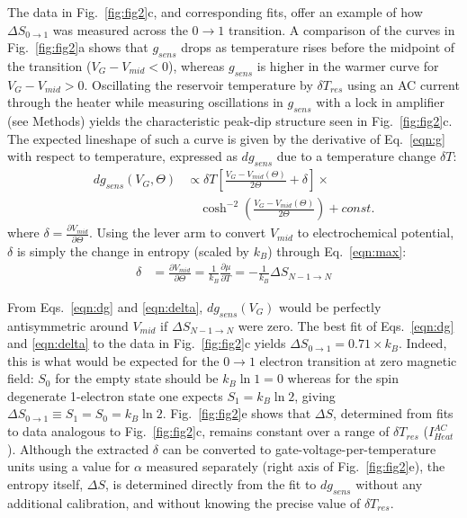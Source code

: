 \documentclass[twocolumn,showpacs,amsmath,amssymb,prl,aps,superscriptaddress]{revtex4-1}
\begin{document}
The data in Fig.~\ref{fig:fig2}c, and corresponding fits, offer an example of how $\Delta S_{0\rightarrow 1}$ was measured across the $0 \rightarrow 1$ transition.  A comparison of the curves in Fig.~\ref{fig:fig2}a shows that $g_{sens}$ drops as temperature rises before the midpoint of the transition ($V_G-V_{mid}<0$), whereas $g_{sens}$ is higher in the warmer curve for $V_G-V_{mid}>0$.   Oscillating the reservoir temperature by $\delta T_{res}$ using an AC current through the heater while measuring oscillations in $g_{sens}$ with a lock in amplifier (see Methods) yields the characteristic peak-dip structure seen in Fig.~\ref{fig:fig2}c.  The expected lineshape of such a curve is given by the derivative of Eq.~\ref{eqn:g} with respect to temperature, expressed as $dg_{sens}$ due to a temperature change $\delta T$:
%
\begin{align}
\label{eqn:dg}
        dg_{sens}(V_G, \Theta) &\propto \delta T \left[ \frac{V_G-V_{mid}(\Theta)}{2\Theta} +\delta \right]\times \\
        				      &\quad\cosh^{-2}\left(\frac{V_G-V_{mid}(\Theta)}{2\Theta}\right) + const. \nonumber
\end{align}
%
where $\delta=\frac{\partial V_{mid}}{\partial \Theta}$. Using the lever arm to convert $V_{mid}$ to electrochemical potential, $\delta$ is simply the change in entropy (scaled by $k_B$) through Eq.~\ref{eqn:max}:
%
\begin{align}
\label{eqn:delta}
        \delta &= \frac{\partial V_{mid}}{\partial \Theta} = 
        \frac{1}{k_B} \frac{\partial \mu}{\partial T} = 
        -\frac{1}{k_B} \Delta S_{N-1\rightarrow N}
\end{align}
%

From Eqs.~\ref{eqn:dg} and \ref{eqn:delta}, $dg_{sens}(V_G)$ would be perfectly antisymmetric around $V_{mid}$ if $\Delta S_{N-1\rightarrow N}$ were zero.  The best fit of Eqs.~\ref{eqn:dg} and \ref{eqn:delta} to the data in Fig.~\ref{fig:fig2}c yields $\Delta S_{0\rightarrow 1}=0.71\times k_B$.  Indeed, this is what would be expected for the $0 \rightarrow 1$ electron transition at zero magnetic field: $S_0$ for the empty state should be $k_B \ln{1}=0$ whereas for the spin degenerate 1-electron state one expects $S_1=k_B\ln{2}$, giving $\Delta S_{0\rightarrow 1}\equiv S_1 = S_0 =k_B\ln{2}$. Fig.~\ref{fig:fig2}e shows that $\Delta S$,  determined from fits to data analogous to Fig.~\ref{fig:fig2}c, remains constant over a range of $\delta T_{res}$ ($I^{AC}_{Heat}$).  Although the extracted $\delta$ can be converted to gate-voltage-per-temperature units using a value for $\alpha$ measured separately (right axis of Fig.~\ref{fig:fig2}e), the entropy itself, $\Delta S$, is determined directly from the fit to $dg_{sens}$ without any additional calibration, and without knowing the precise value of $\delta T_{res}$.
\end{document}
